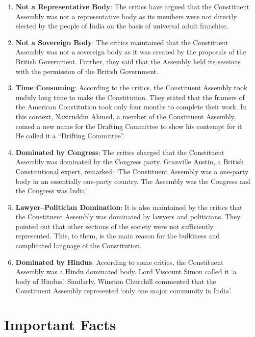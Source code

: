 \begin{multicol}{2}
\begin{enumerate}
  \item \textbf{Not a Representative Body}: The critics have argued that the Constituent  Assembly was not a representative body as its members were not directly elected by the people of India on the basis of universal adult franchise.
  \item \textbf{Not a Sovereign Body}: The critics maintained that the Constituent Assembly was not a sovereign body as it was created by the proposals of the British Government. Further, they said that the Assembly held its sessions with the permission of the British Government.
  \item \textbf{Time Consuming}: According to the critics, the Constituent Assembly took unduly long time to make the Constitution. They stated that the framers of the American Constitution took only four months to complete their work. In this context, Naziruddin Ahmed, a member of the Constituent Assembly, coined a new name for the Drafting Committee to show his contempt for it. He called it a ``Drifting Committee''.
  \item \textbf{Dominated by Congress}: The critics charged that the Constituent Assembly was dominated by the Congress party. Granville Austin, a British Constitutional expert, remarked: `The Constituent Assembly was a one-party body in an essentially one-party country. The Assembly was the Congress and the Congress was India'\endnote.
  \item \textbf{Lawyer–Politician Domination}: It is also maintained by the critics that the Constituent Assembly was dominated by lawyers and politicians. They pointed out that other sections of the society were not sufficiently represented. This, to them, is the main reason for the bulkiness and complicated language of the Constitution.
  \item \textbf{Dominated by Hindus}: According to some critics, the Constituent Assembly was a Hindu dominated body. Lord Viscount Simon called it `a body of Hindus'. Similarly, Winston Churchill commented that the Constituent Assembly represented `only one major community in India'.
\end{enumerate}


\section{Important Facts}


\end{multicol}
